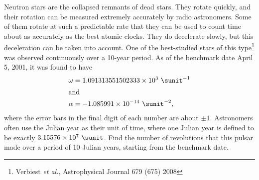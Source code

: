Neutron stars are the collapsed remnants of dead stars.
They rotate quickly, and their rotation can be measured extremely
accurately by radio astronomers. Some of them rotate at such a predictable
rate that they can be used to count time about as accurately as the
best atomic clocks. They do decelerate slowly, but this
deceleration can be taken into account. One of the best-studied
stars of this type\footnote{Verbiest \emph{et al.}, Astrophysical Journal 679 (675) 2008}
was observed continuously over a 10-year period. As of
the benchmark date April 5, 2001, it was found to have
\begin{align*}
  \omega &= 1.091313551502333\times10^{3}\ \sunit^{-1} \\
\intertext{and}
  \alpha &= -1.085991\times10^{-14}\ \sunit^{-2},
\end{align*}
where the error bars in the final digit of each number are about $\pm 1$.
Astronomers often use the Julian year as their unit of time, where one
Julian year is defined to be exactly $3.15576\times10^7\ \sunit$. Find the
number of revolutions that this pulsar made over a period of 10 Julian
years, starting from the benchmark date.\answercheck

